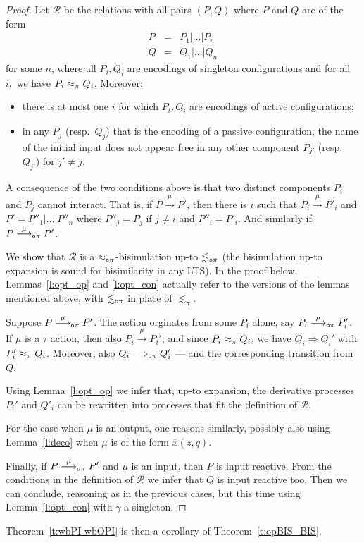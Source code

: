 \documentclass[11pt,a4paper]{amsart}
\theoremstyle{plain}
\theoremstyle{definition}
\theoremstyle{defC}
\theoremstyle{thmC}
\theoremstyle{plain}
\numberwithin{equation}{section}
\def\bout#1#2{\overline{#1}(#2)}   %
\newcommand{\rmm}[1]{{\tt{\lowercase{#1}}}}
\newcommand{\genarr}[2]{\mathrel{\stackrel{{#1}}{\longrightarrow}_{\rmm{\lowercase{#2}}}}}
\newcommand{\genArr}[2]{\mathrel{\stackrel{{#1}}{\Longrightarrow}_{\rmm{\lowercase{#2}}}}}  %
\newcommand{\arrN}[1]{\genarr{#1}{o\pi}}  %
\newcommand{\ArrN}[1]{\genArr{#1}{o\pi}}  %
\newcommand{\arr}[1]{\mathrel{\stackrel{{#1}}{\longrightarrow}}}  %
\newcommand{\RaN}{\ArrN{}}
\newcommand{\genwb}[1]{\mathrel{\approx_{\rmm{\lowercase{#1}}}}}       %
\newcommand{\wbPI}{\genwb{\pi}}       %
\newcommand{\wbOPI}{\genwb{o\pi}}       %
\newcommand{\expa}{\mathrel{\lesssim_{\pi}}}
\newcommand{\expaOP}{\mathrel{\lesssim_{\rmm{o}\pi}}} %
\def\R{{\mathcal R}}
\newcommand{\FF}{F}
\newcommand{\GG}{G}
\newcommand{\cbvSymb}{{\mathcal {V}}}
\newcommand{\encoEnvI}[1]{ \cbvSymb[\! [ #1 ] \! ]  } %
\newcommand{\encoConI}{\encoEnvI} %
\theoremstyle{plain}
\theoremstyle{definition}
\begin{document}
\begin{proof}
Let $\R$ be the relations with all pairs $(P,Q)$ where $P$ and $Q$ are of the
form 
\[
\begin{array}{rcl}
 P &=&   %
P_1  | \ldots | P_n
\\
 Q &=& %
Q_1  | \ldots | Q_n
\end{array}
 \] 
for some $n$, where all $P_i,Q_i$ are 
encodings of singleton configurations and  for all $i, $ we have $P_i \wbPI Q_i$.
Moreover:
\begin{itemize}
\item
 there is at most one $i$ for which  $P_i,Q_i$ are encodings of  active
configurations;
\item  in any $P_j$ (resp.\ $Q_j$) that is the encoding of a passive
configuration, the name of the initial input does not appear free in any other component
$P_{j'}$ (resp.\ $Q_{j'}$) for $j'\neq j$. 
\end{itemize} 
\noindent
A consequence of the two conditions above is that two distinct components $P_i$ and $P_j$
cannot interact. That is, if $P \arr \mu P'$,  then there is $i$ such
that $P_i \arr \mu P'_i$ and $P' = P''_1| \ldots | P''_n$ where $P''_j = P_j $ if $j\neq i$
and $P''_i = P'_i $. And similarly if   $P \arrN \mu P'$.



We  show that  $\R$ is a  $\wbOPI$-bisimulation  up-to $\expaOP$ (the bisimulation
up-to expansion is sound for bisimilarity in any LTS). 
In the proof below,  Lemmas~\ref{l:opt_op}  and 
\ref{l:opt_con}
actually refer to the versions of the lemmas mentioned above, with $\expaOP$
in place of $\expa$.  


Suppose $P \arrN \mu P'$.  The action orginates from some $P_i$ alone, say $P_i \arrN\mu P_i'$.
If $\mu$ is a $\tau $ action, then also $P_i \arr\mu P_i'$; 
and since $P_i \wbPI Q_i$, we have $Q_i \Longrightarrow  Q_i'$ with $P_i' \wbPI Q_i$.  
Moreover, also $Q_i \RaN  Q_i'$ --- and the corresponding transition from $Q$.


Using Lemma~\ref{l:opt_op} we infer that, up-to expansion, the
derivative processes $P_i'$ and $Q'_i$ can be rewritten into processes
that fit the definition of $\R$. 

For the case when $\mu$ is an output, one reasons similarly, possibly
also using Lemma~\ref{l:deco} when $\mu $ is of the form $\bout x {z,q}$.  

Finally, if $P \arrN \mu P'$ and $\mu$ is an input, then $P $ is input
reactive. From the conditions in the definition of $\R$ we infer that
$Q$ is input reactive too.  Then we can conclude, reasoning as in the
previous cases, but this time  using Lemma~\ref{l:opt_con} with
$\gamma   $ a singleton.  
\end{proof}  
\noindent
Theorem~\ref{t:wbPI-wbOPI}  is then a corollary of
Theorem~\ref{t:opBIS_BIS}.  
\end{document}
